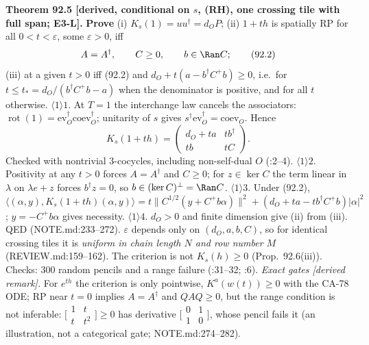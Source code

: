 \textbf{Theorem 92.5 [derived, conditional on \(s\), (RH), one crossing tile with full span; E3-L].}
\textbf{Prove} (i) \(K_s(1)=uu^\dagger=d_OP\); (ii) \(1+th\) is spatially RP for all \(0<t<\varepsilon\), some
\(\varepsilon>0\), iff
\begin{equation}
  A=A^\dagger,\qquad C\ge0,\qquad b\in\Ran C;\tag{92.2}
\end{equation}
(iii) at a given \(t>0\) iff (92.2) and \(d_O+t(a-b^\dagger C^+b)\ge0\), i.e.\ for
\(t\le t_*=d_O/(b^\dagger C^+b-a)\) when the denominator is positive, and for all \(t\) otherwise.
\(\langle1\rangle1\). At \(T=1\) the interchange law cancels the associators: \(\operatorname{rot}(1)=\mathrm{ev}_O^\dagger
\mathrm{coev}_O^\dagger\); unitarity of \(s\) gives \(s^\dagger\mathrm{ev}_O^\dagger=\mathrm{coev}_O\).  Hence
\begin{equation}
  K_s(1+th)=\begin{pmatrix}d_O+ta & tb^\dagger\\ tb & tC\end{pmatrix}.\tag{92.3}
\end{equation}
Checked with nontrivial 3-cocycles, including non-self-dual \(O\) (:2--4).
\(\langle1\rangle2\). Positivity at any \(t>0\) forces \(A=A^\dagger\) and \(C\ge0\); for \(z\in\ker C\) the term linear
in \(\lambda\) on \(\lambda e+z\) forces \(b^\dagger z=0\), so \(b\in(\ker C)^\perp=\Ran C\).
\(\langle1\rangle3\). Under (92.2), \(\langle(\alpha,y),K_s(1+th)(\alpha,y)\rangle=t\|C^{1/2}(y+C^+b\alpha)\|^2
+(d_O+ta-tb^\dagger C^+b)|\alpha|^2\); \(y=-C^+b\alpha\) gives necessity.
\(\langle1\rangle4\). \(d_O>0\) and finite dimension give (ii) from (iii).  QED (NOTE.md:233--272).
\(\varepsilon\) depends only on \((d_O,a,b,C)\), so for identical crossing tiles it is \emph{uniform in chain length \(N\)
and row number \(M\)} (REVIEW.md:159--162).  The criterion is not \(K_s(h)\ge0\) (Prop.~92.6(iii)).  Checks: 300 random
pencils and a range failure (:31--32; :6).
\emph{Exact gates [derived remark].}  For \(e^{th}\) the criterion is only pointwise, \(K^a(w(t))\ge0\) with the CA-78
ODE; RP near \(t=0\) implies \(A=A^\dagger\) and \(QAQ\ge0\), but the range condition is not inferable: \(\big[\begin{smallmatrix}
1&t\\t&t^2\end{smallmatrix}\big]\ge0\) has derivative \(\big[\begin{smallmatrix}0&1\\1&0\end{smallmatrix}\big]\), whose pencil fails
it (an illustration, not a categorical gate; NOTE.md:274--282).

